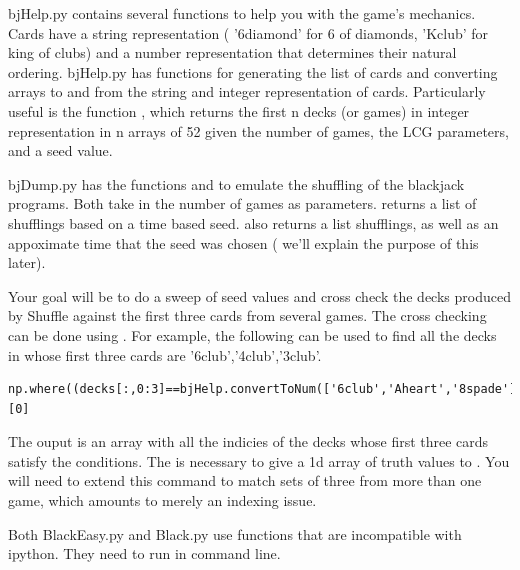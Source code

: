 bjHelp.py contains several functions to help you with the game's mechanics.
 Cards have a string representation ( '6diamond' for 6 of diamonds, 'Kclub' for king of clubs) and a number representation that determines their natural ordering. 
bjHelp.py has functions for generating the list  of cards and converting arrays to and from the string and integer representation of cards. 
Particularly useful is the function , which returns the first n decks (or games) in integer representation in n arrays of 52 given the number of games, the LCG parameters, and a seed value.

bjDump.py has the functions  and  to emulate the shuffling of the blackjack programs. 
Both take in the number of games as parameters. 
 returns a list of shufflings based on a time based seed. 
 also returns a list shufflings, as well as an appoximate time that the seed was chosen ( we'll explain the purpose of this later).

Your goal will be to do a sweep of seed values and cross check the decks produced by Shuffle against the first three cards from several games. 
The cross checking can be done using . 
For example, the following can be used to find all the decks in  whose first three cards are '6club','4club','3club'.

\begin{lstlisting}
np.where((decks[:,0:3]==bjHelp.convertToNum(['6club','Aheart','8spade'])).all(axis=1))[0]
\end{lstlisting}

The ouput is an array with all the indicies of the decks whose first three cards satisfy the conditions. 
The  is necessary to give a 1d array of truth values to .
You will need to extend this command to match sets of three from more than one game, which amounts to merely an indexing issue.

\begin{warn}
Both BlackEasy.py and Black.py use functions that are incompatible with ipython. They need to run  in command line.
\end{warn}


